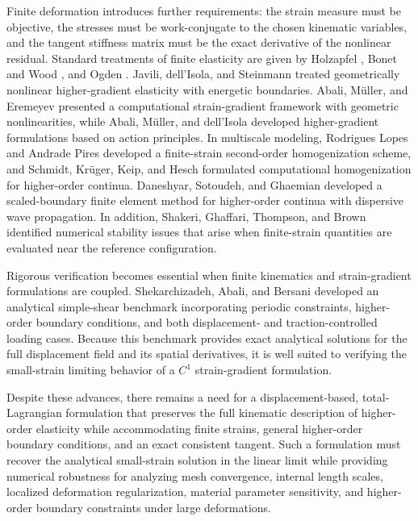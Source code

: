 \documentclass[preprint,12pt]{elsarticle}
\begin{document}
Finite deformation introduces further requirements: the strain measure must be
objective, the stresses must be work-conjugate to the chosen kinematic
variables, and the tangent stiffness matrix must be the exact derivative of
the nonlinear residual. Standard treatments of finite elasticity are given by
Holzapfel \cite{Holzapfel2000}, Bonet and Wood \cite{BonetWood2008}, and
Ogden \cite{Ogden1997}. Javili, dell'Isola, and Steinmann
\cite{JaviliDellIsolaSteinmann2013} treated geometrically nonlinear
higher-gradient elasticity with energetic boundaries. Abali, M\"uller,
and Eremeyev \cite{AbaliMullerEremeyev2015} presented a computational
strain-gradient framework with geometric nonlinearities, while Abali,
M\"uller, and dell'Isola \cite{AbaliMullerDellIsola2017} developed
higher-gradient formulations based on action principles. In multiscale modeling,
Rodrigues Lopes and Andrade Pires \cite{RodriguesLopesAndradePires2022} developed
a finite-strain second-order homogenization scheme, and Schmidt, Kr\"uger,
Keip, and Hesch \cite{SchmidtKrugerKeipHesch2022} formulated computational
homogenization for higher-order continua. Daneshyar, Sotoudeh, and
Ghaemian \cite{DaneshyarSotoudehGhaemian2022} developed a scaled-boundary
finite element method for higher-order continua with dispersive wave
propagation. In addition, Shakeri, Ghaffari, Thompson, and Brown
\cite{ShakeriGhaffariThompsonBrown2024} identified numerical stability
issues that arise when finite-strain quantities are evaluated near
the reference configuration.

Rigorous verification becomes essential when finite kinematics and
strain-gradient formulations are coupled. Shekarchizadeh, Abali, and Bersani
\cite{ShekarchizadehAbaliBersani2022} developed an analytical simple-shear
benchmark incorporating periodic constraints, higher-order boundary conditions,
and both displacement- and traction-controlled loading cases. Because this
benchmark provides exact analytical solutions for the full displacement field
and its spatial derivatives, it is well suited to verifying the small-strain
limiting behavior of a $C^1$ strain-gradient formulation.

Despite these advances, there remains a need for a displacement-based,
total-Lagrangian formulation that preserves the full kinematic description of
higher-order elasticity while accommodating finite strains, general
higher-order boundary conditions, and an exact consistent tangent. Such a
formulation must recover the analytical small-strain solution in the linear
limit while providing numerical robustness for analyzing mesh convergence,
internal length scales, localized deformation regularization, material
parameter sensitivity, and higher-order boundary constraints under large
deformations.
\end{document}
